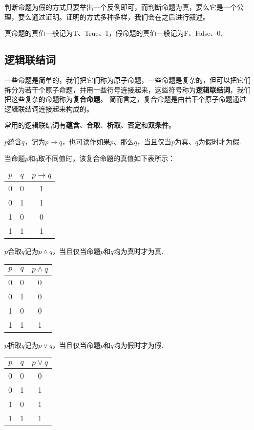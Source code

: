     判断命题为假的方式只要举出一个反例即可，而判断命题为真，要么它是一个公理，要么通过证明。证明的方式多种多样，我们会在之后进行叙述。

    真命题的真值一般记为T、True、1，假命题的真值一般记为F、False、0.

\subsection{逻辑联结词}
一些命题是简单的，我们把它们称为原子命题，一些命题是复杂的，但可以把它们拆分为若干个原子命题，并用一些符号连接起来，这些符号称为\textbf{逻辑联结词}，我们把这些复杂的命题称为\textbf{复合命题}。
简而言之，复合命题是由若干个原子命题通过逻辑联结词连接起来构成的。

常用的逻辑联结词有\textbf{蕴含}、\textbf{合取}、\textbf{析取}、\textbf{否定}和\textbf{双条件}。

\begin{definition}[蕴含]
    $p$蕴含$q$，记为$p \to q$，也可读作如果$p$、那么$q$，当且仅当$p$为真、$q$为假时才为假.
\end{definition}

当命题$p$和$q$取不同值时，该复合命题的真值如下表所示：

\begin{tabular}{c|c|c}
    $p$ & $q$ & $p \to q$ \\
    \hline
    0 & 0 & 1 \\
    0 & 1 & 1 \\
    1 & 0 & 0 \\
    1 & 1 & 1
\end{tabular}

\begin{definition}[合取]
    $p$合取$q$记为$p \wedge q$，当且仅当命题$p$和$q$均为真时才为真.
\end{definition}
\begin{tabular}{c|c|c}
    $p$ & $q$ & $p \wedge q$ \\
    \hline
    0 & 0 & 0 \\
    0 & 1 & 0 \\
    1 & 0 & 0 \\
    1 & 1 & 1
\end{tabular}

\begin{definition}[析取]
    $p$析取$q$记为$p \vee q$，当且仅当命题$p$和$q$均为假时才为假.
\end{definition}
\begin{tabular}{c|c|c}
    $p$ & $q$ & $p \vee q$ \\
    \hline
    0 & 0 & 0 \\
    0 & 1 & 1 \\
    1 & 0 & 1 \\
    1 & 1 & 1
\end{tabular}

